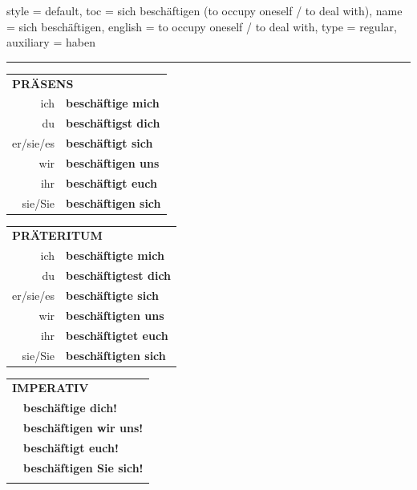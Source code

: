 \begin{verbentry}{
  style = {default},
  toc = {sich beschäftigen (to occupy oneself / to deal with)},
  name = {sich beschäftigen},
  english = {to occupy oneself / to deal with},
  type = {regular},
  auxiliary = {haben}
}
 
    
     \vspace{5pt}

    \hrule
    
    \vspace{5pt}

  \begin{tabular}{rl}
     \multicolumn{2}{l}{\textbf{PRÄSENS} }\\
    ich & \textbf{beschäftige mich}\\
    du & \textbf{beschäftigst dich}\\
    er/sie/es & \textbf{beschäftigt sich}\\
    wir & \textbf{beschäftigen uns}\\
    ihr & \textbf{beschäftigt euch}\\
    sie/Sie & \textbf{beschäftigen sich}\\
  \end{tabular}
  \hfill
     \begin{tabular}{rl}
    \multicolumn{2}{l}{\textbf{PRÄTERITUM} }\\
    ich & \textbf{beschäftigte mich}\\
    du & \textbf{beschäftigtest dich}\\
    er/sie/es & \textbf{beschäftigte sich}\\
    wir & \textbf{beschäftigten uns}\\
    ihr & \textbf{beschäftigtet euch}\\
    sie/Sie & \textbf{beschäftigten sich}\\
  \end{tabular}
  \hfill
  \begin{tabular}{rl}
     \multicolumn{2}{l}{\textbf{IMPERATIV} }\\
   & \textbf{beschäftige dich!}\\
   & \textbf{beschäftigen wir uns!}\\
   & \textbf{beschäftigt euch!}\\
   & \textbf{beschäftigen Sie sich!}\\
   & \vspace{10pt}
  \end{tabular}


\end{verbentry}
